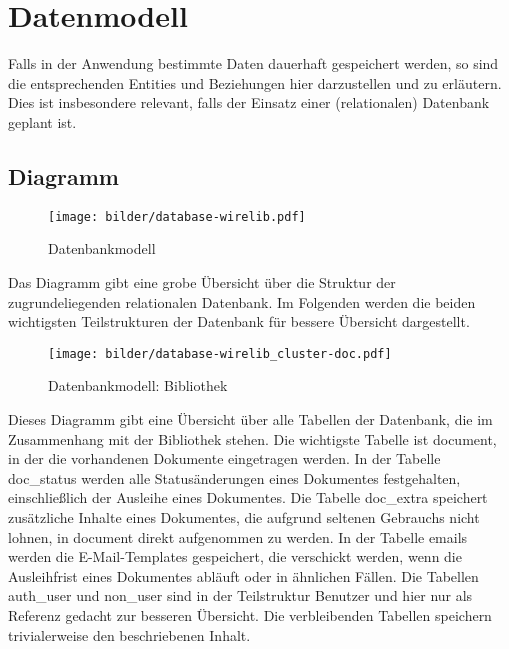 \chapter{Datenmodell}
Falls in der Anwendung bestimmte Daten dauerhaft gespeichert werden, so sind
die entsprechenden Entities und Beziehungen hier darzustellen und zu erl\"autern.
Dies ist insbesondere relevant, falls der Einsatz einer (relationalen)
Datenbank geplant ist.

\section{Diagramm}


\begin{figure}[!htb]
\texttt{[image: bilder/database-wirelib.pdf]}
\caption{Datenbankmodell}
\label{fig:DBDiagramm}
\end{figure}

Das Diagramm gibt eine grobe Übersicht über die Struktur der zugrundeliegenden
relationalen Datenbank. Im Folgenden werden die beiden wichtigsten
Teilstrukturen der Datenbank für bessere Übersicht dargestellt.


\begin{figure}[!htb]
\texttt{[image: bilder/database-wirelib\_cluster-doc.pdf]}
\caption{Datenbankmodell: Bibliothek}
\label{fig:DB_docDiagramm}
\end{figure}

Dieses Diagramm gibt eine Übersicht über alle Tabellen der Datenbank, die im
Zusammenhang mit der Bibliothek stehen. Die wichtigste Tabelle ist document, in
der die vorhandenen Dokumente eingetragen werden. In der Tabelle doc\_status
werden alle Statusänderungen eines Dokumentes festgehalten, einschließlich der
Ausleihe eines Dokumentes. Die Tabelle doc\_extra speichert zusätzliche Inhalte
eines Dokumentes, die aufgrund seltenen Gebrauchs nicht lohnen, in document
direkt aufgenommen zu werden. In der Tabelle emails werden die E-Mail-Templates
gespeichert, die verschickt werden, wenn die Ausleihfrist eines Dokumentes
abläuft oder in ähnlichen Fällen. Die Tabellen auth\_user und non\_user sind
in der Teilstruktur Benutzer und hier nur als Referenz gedacht zur besseren
Übersicht. Die verbleibenden Tabellen speichern trivialerweise den
beschriebenen Inhalt.


